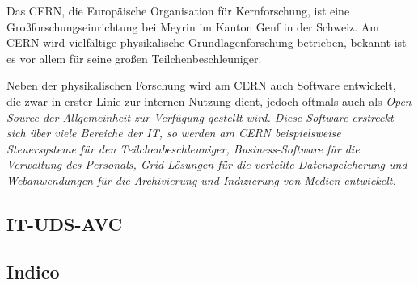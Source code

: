 Das CERN, die Europäische Organisation für Kernforschung, ist eine Großforschungseinrichtung bei
Meyrin im Kanton Genf in der Schweiz. Am CERN wird vielfältige physikalische Grundlagenforschung
betrieben, bekannt ist es vor allem für seine großen Teilchenbeschleuniger. \citep{wiki:cern}

Neben der physikalischen Forschung wird am CERN auch Software entwickelt, die zwar in erster Linie
zur internen Nutzung dient, jedoch oftmals auch als \em{Open Source} der Allgemeinheit zur Verfügung
gestellt wird. Diese Software erstreckt sich über viele Bereiche der IT, so werden am CERN
beispielsweise Steuersysteme für den Teilchenbeschleuniger, Business-Software für die Verwaltung des
Personals, Grid-Lösungen für die verteilte Datenspeicherung und Webanwendungen für die Archivierung
und Indizierung von Medien entwickelt.

\subsection{IT-UDS-AVC}



\subsection{Indico}

